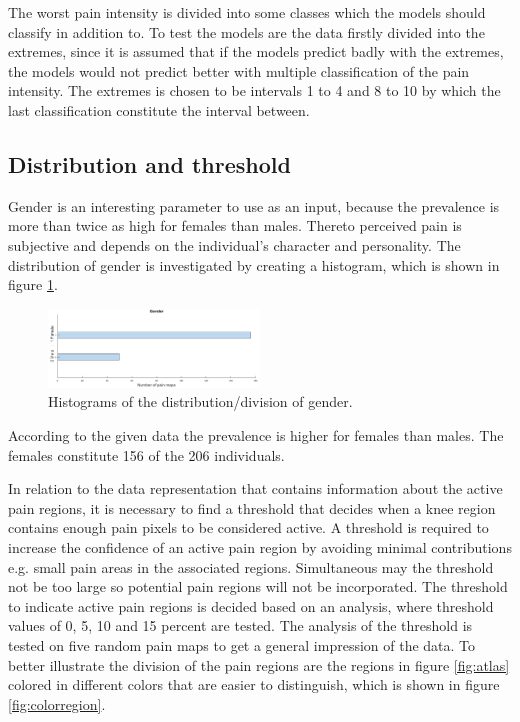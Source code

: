 \noindent
The worst pain intensity is divided into some classes which the models should classify in addition to. To test the models are the data firstly divided into the extremes, since it is assumed that if the models predict badly with the extremes, the models would not predict better with multiple classification of the pain intensity. The extremes is chosen to be intervals 1 to 4 and 8 to 10 by which the last classification constitute the interval between. 


\subsection{Distribution and threshold}
Gender is an interesting parameter to use as an input, because the prevalence is more than twice as high for females than males. Thereto perceived pain is subjective and depends on the individual's character and personality. The distribution of gender is investigated by creating a histogram, which is shown in figure \ref{fig:histogender}. 

\begin{figure} [H]
\centering
\includegraphics[width=0.5\textwidth]{figures/histoGender}
\caption{Histograms of the distribution/division of gender.}
\label{fig:histogender}
\end{figure}

\noindent
According to the given data the prevalence is higher for females than males. The females constitute 156 of the 206 individuals.

\noindent 
In relation to the data representation that contains information about the active pain regions, it is necessary to find a threshold that decides when a knee region contains enough pain pixels to be considered active. A threshold is required to increase the confidence of an active pain region by avoiding minimal contributions e.g. small pain areas in the associated regions. Simultaneous may the threshold not be too large so potential pain regions will not be incorporated. The threshold to indicate active pain regions is decided based on an analysis, where threshold values of 0, 5, 10 and 15 percent are tested. The analysis of the threshold is tested on five random pain maps to get a general impression of the data. To better illustrate the division of the pain regions are the regions in figure \ref{fig:atlas} colored in different colors that are easier to distinguish, which is shown in figure \ref{fig:colorregion}.


